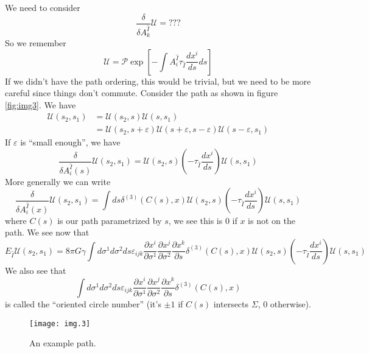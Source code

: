 We need to consider 
\begin{equation}
\frac{\delta}{\delta A^{\hat{I}}_{k}}\mathcal{U}=???
\end{equation}
So we remember
\begin{equation}
\mathcal{U} = \mathcal{P}\exp\left[-\int A^{\hat{I}}_{i}\tau_{\hat{I}}\frac{dx^i}{ds}ds\right]
\end{equation}
If we didn't have the path ordering, this would be trivial, but
we need to be more careful since things don't commute. Consider
the path as shown in figure \eqref{fig:img3}. We have
\begin{subequations}
\begin{align}
\mathcal{U}(s_2,s_1) &= \mathcal{U}(s_2,s)\mathcal{U}(s,s_1)\\
&= \mathcal{U}(s_2,s+\varepsilon)\mathcal{U}(s+\varepsilon,s-\varepsilon)\mathcal{U}(s-\varepsilon,s_1)
\end{align}
\end{subequations}
If $\varepsilon$ is ``small enough'', we have
\begin{equation}
\frac{\delta}{\delta A^{\hat{I}}_{i}(s)}\mathcal{U}(s_2,s_1) =
\mathcal{U}(s_2,s)\left(-\tau_{\hat{I}}\frac{dx^i}{ds}\right)\mathcal{U}(s,s_1)
\end{equation}
More generally we can write
\begin{equation}
\frac{\delta}{\delta A^{\hat{I}}_{i}(x)}\mathcal{U}(s_2,s_1) =
\int ds \delta^{(3)}(C(s),x)\mathcal{U}(s_2,s)\left(-\tau_{\hat{I}}\frac{dx^i}{ds}\right)\mathcal{U}(s,s_1)
\end{equation}
where $C(s)$ is our path parametrized by $s$, we see this is 0 if
$x$ is not on the path. We see now that
\begin{equation}
E_{\hat{I}}\mathcal{U}(s_2,s_1) = 8\pi G\gamma \int d\sigma^1 d\sigma^2 ds \varepsilon_{ijk}\frac{\partial
  x^i}{\partial \sigma^1}\frac{\partial x^j}{\partial
  \sigma^2}\frac{\partial x^k}{\partial s}\delta^{(3)}(C(s),x)\mathcal{U}(s_2,s)\left(-\tau_{\hat{I}}\frac{dx^i}{ds}\right)\mathcal{U}(s,s_1)
\end{equation}
We also see that
\begin{equation}
\int d\sigma^1 d\sigma^2 ds \varepsilon_{ijk}\frac{\partial
  x^i}{\partial \sigma^1}\frac{\partial x^j}{\partial
  \sigma^2}\frac{\partial x^k}{\partial s}\delta^{(3)}(C(s),x)
\end{equation}
is called the ``oriented circle number'' (it's $\pm1$ if $C(s)$
intersects $\Sigma$, 0 otherwise).
\begin{figure}
\texttt{[image: img.3]}
\caption{An example path.}\label{fig:img3}
\end{figure}

